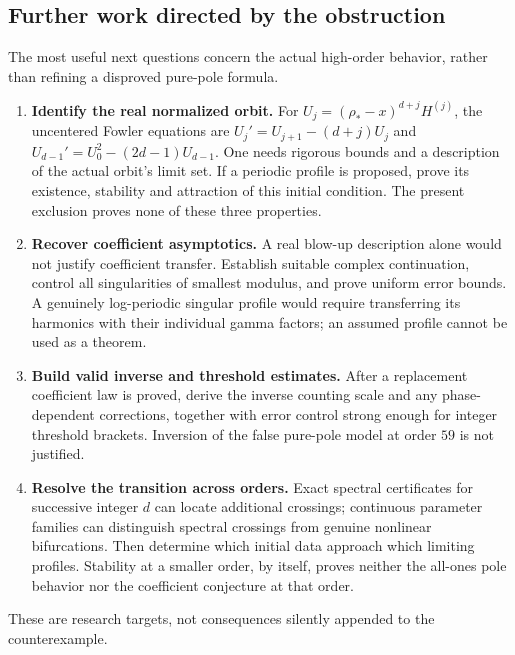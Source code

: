 \documentclass[11pt]{article}
\theoremstyle{remark}\newtheorem{remark}[theorem]{Remark}
\numberwithin{equation}{section}
\begin{document}
\subsection{Further work directed by the obstruction}
The most useful next questions concern the actual high-order behavior,
rather than refining a disproved pure-pole formula.
\begin{enumerate}[label=\arabic*.]
\item \textbf{Identify the real normalized orbit.}
For $U_j=(\rho_*-x)^{d+j}H^{(j)}$, the uncentered Fowler equations are
$U_j'=U_{j+1}-(d+j)U_j$ and
$U_{d-1}'=U_0^2-(2d-1)U_{d-1}$.
One needs rigorous bounds and a description of the actual orbit's
limit set. If a periodic profile is proposed, prove its existence,
stability and attraction of this initial condition. The present
exclusion proves none of these three properties.
\item \textbf{Recover coefficient asymptotics.}
A real blow-up description alone would not justify coefficient
transfer. Establish suitable complex continuation, control all
singularities of smallest modulus, and prove uniform error bounds.
A genuinely log-periodic singular profile would require transferring
its harmonics with their individual gamma factors; an assumed
profile cannot be used as a theorem.
\item \textbf{Build valid inverse and threshold estimates.}
After a replacement coefficient law is proved, derive the inverse
counting scale and any phase-dependent corrections, together with
error control strong enough for integer threshold brackets.
Inversion of the false pure-pole model at order $59$ is not justified.
\item \textbf{Resolve the transition across orders.}
Exact spectral certificates for successive integer $d$ can locate
additional crossings; continuous parameter families can distinguish
spectral crossings from genuine nonlinear bifurcations. Then determine
which initial data approach which limiting profiles. Stability at a
smaller order, by itself, proves neither the all-ones pole behavior
nor the coefficient conjecture at that order.
\end{enumerate}
These are research targets, not consequences silently appended to the
counterexample.
\end{document}
